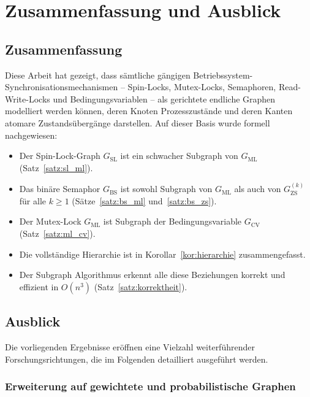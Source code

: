 ﻿\documentclass[a4paper,12pt]{article}
\theoremstyle{definition}
\begin{document}
\section{Zusammenfassung und Ausblick}
\label{sec:zusammenfassung}

\subsection{Zusammenfassung}

Diese Arbeit hat gezeigt, dass sämtliche gängigen Betriebssystem-Synchroni\-sa\-tions\-me\-cha\-nis\-men -- Spin-Locks, Mutex-Locks, Semaphoren, Read-Write-Locks
und Bedingungsvariablen -- als gerichtete endliche Graphen modelliert werden
können, deren Knoten Prozesszustände und deren Kanten atomare
Zustandsübergänge darstellen. Auf dieser Basis wurde formell nachgewiesen:

\begin{itemize}
  \item Der Spin-Lock-Graph $G_{\mathrm{SL}}$ ist ein schwacher Subgraph von
        $G_{\mathrm{ML}}$ (Satz~\ref{satz:sl_ml}).
  \item Das binäre Semaphor $G_{\mathrm{BS}}$ ist sowohl Subgraph von
        $G_{\mathrm{ML}}$ als auch von $G_{\mathrm{ZS}}^{(k)}$ für alle
        $k \geq 1$ (Sätze~\ref{satz:bs_ml} und~\ref{satz:bs_zs}).
  \item Der Mutex-Lock $G_{\mathrm{ML}}$ ist Subgraph der Bedingungsvariable
        $G_{\mathrm{CV}}$ (Satz~\ref{satz:ml_cv}).
  \item Die vollständige Hierarchie ist in Korollar~\ref{kor:hierarchie}
        zusammengefasst.
  \item Der Subgraph Algorithmus erkennt alle diese Beziehungen korrekt und
        effizient in $O(n^3)$ (Satz~\ref{satz:korrektheit}).
\end{itemize}

\subsection{Ausblick}

Die vorliegenden Ergebnisse eröffnen eine Vielzahl weiterführender
Forschungsrichtungen, die im Folgenden detailliert ausgeführt werden.

\subsubsection{Erweiterung auf gewichtete und probabilistische Graphen}
\end{document}

